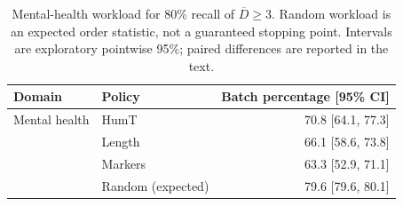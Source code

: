 \begin{table}[t]
\centering\small
\caption{Mental-health workload for 80\% recall of $\overline D\geq3$. Random workload is an expected order statistic, not a guaranteed stopping point. Intervals are exploratory pointwise 95\%; paired differences are reported in the text.}
\label{tab:workload}
\begin{tabular}{llr}
\toprule
Domain & Policy & Batch percentage [95\% CI] \\
\midrule
Mental health & HumT & 70.8 [64.1, 77.3] \\
 & Length & 66.1 [58.6, 73.8] \\
 & Markers & 63.3 [52.9, 71.1] \\
 & Random (expected) & 79.6 [79.6, 80.1] \\
\bottomrule
\end{tabular}
\end{table}
